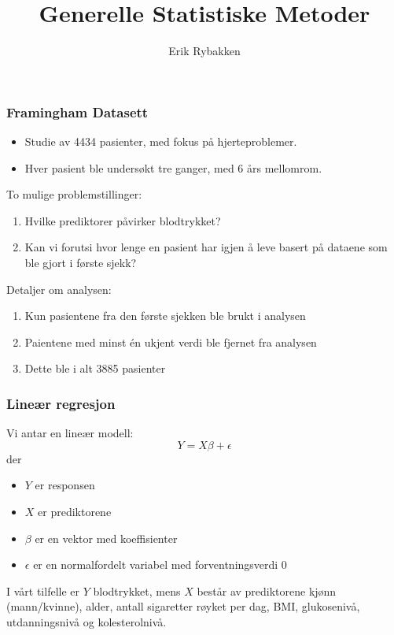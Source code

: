 \documentclass[aspectratio=169]{beamer}
\title{Generelle Statistiske Metoder}
\author{Erik Rybakken}
\begin{document}
\frame{\titlepage}

\begin{frame}
  \frametitle{Framingham Datasett}
  \begin{itemize}
    \item Studie av 4434 pasienter, med fokus på hjerteproblemer.
    \pause
    \item Hver pasient ble undersøkt tre ganger, med 6 års mellomrom.
  \end{itemize}

  \pause

  To mulige problemstillinger:
  \begin{enumerate}
    \item Hvilke prediktorer påvirker blodtrykket?
    \pause
    \item Kan vi forutsi hvor lenge en pasient har igjen å leve basert på dataene som ble gjort i første sjekk?
  \end{enumerate}
  \pause
  Detaljer om analysen:
  \begin{enumerate}
    \item Kun pasientene fra den første sjekken ble brukt i analysen
    \pause
    \item Paientene med minst én ukjent verdi ble fjernet fra analysen
    \pause
    \item Dette ble i alt 3885 pasienter
  \end{enumerate}
\end{frame}

\begin{frame}
  \frametitle{Lineær regresjon}
  Vi antar en lineær modell:
  \begin{equation}
    Y = X \beta + \epsilon
  \end{equation}
  \pause
  der
  \begin{itemize}
    \item \(Y\) er responsen
    \item \(X\) er prediktorene
    \item \(\beta\) er en vektor med koeffisienter
    \item \(\epsilon\) er en normalfordelt variabel med forventningsverdi 0
  \end{itemize}
  \pause
  I vårt tilfelle er \(Y\) blodtrykket, mens \(X\) består av prediktorene kjønn (mann/kvinne), alder,
  antall sigaretter røyket per dag, BMI, glukosenivå, utdanningsnivå og kolesterolnivå.
\end{frame}
\end{document}
